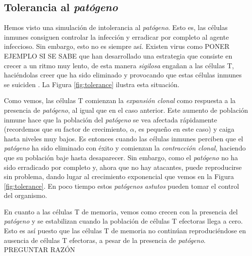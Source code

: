 
\subsection{Tolerancia al \textit{patógeno}}
\label{sim:toler}

Hemos visto una simulación de intolerancia al \textit{patógeno}. Esto es, las células inmunes consiguen controlar la infección y erradicar por completo al agente infeccioso. Sin embargo, esto no es siempre así. Existen virus como PONER EJEMPLO SI SE SABE que han desarrollado una estrategia que consiste en crecer a un ritmo muy lento, de esta manera \textit{sigilosa} engañan a las células T, haciéndolas creer que ha sido eliminado y provocando que estas células inmunes se suiciden  \citep{leggett2017growth}. La Figura \ref{fig:tolerance} ilustra esta situación.

Como vemos, las células T comienzan la \textit{expansión clonal} como respuesta a la presencia de \textit{patógeno}, al igual que en el caso anterior. Este aumento de población inmune hace que la población del \textit{patógeno} se vea afectada rápidamente (recordemos que su factor de crecimiento, $\alpha$, es pequeño en este caso) y caiga hasta niveles muy bajos. Es entonces cuando las células inmunes perciben que el \textit{patógeno} ha sido eliminado con éxito y comienzan la \textit{contracción clonal}, haciendo que su población baje hasta desaparecer. Sin embargo, como el \textit{patógeno} no ha sido erradicado por completo y, ahora que no hay atacantes, puede reproducirse sin problema, dando lugar al crecimiento exponencial que vemos en la Figura \ref{fig:tolerance}. En poco tiempo estos \textit{patógenos} \textit{astutos} pueden tomar el control del organismo. 

En cuanto a las células T de memoria, vemos como crecen con la presencia del \textit{patógeno} y se estabilizan cuando la población de células T efectoras llega a cero. Esto es así puesto que las células T de memoria no continúan reproduciéndose en ausencia de células T efectoras, a pesar de la presencia de \textit{patógeno}. PREGUNTAR RAZÓN 


